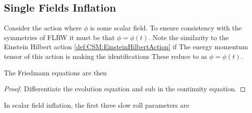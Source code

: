 \documentclass{article}
\begin{document}
\subsection{Single Fields Inflation}

Consider the action
where $\phi$ is some scalar field. To ensure consistency with the symmetries of FLRW it must be that $\phi = \phi(t)$.  Note the similarity to the Einstein Hilbert action \ref{def:CSM:EinsteinHilbertAction} if 
The energy momentum tensor of this action is 
making the identifications 
These reduce to 
as $\phi=\phi(t)$. 

The Friedmann equations are then 

\begin{prop}
\end{prop}
\begin{proof}
Differentiate the evolution equation and sub in the continuity equation. 
\end{proof}

\begin{definition}
In scalar field inflation, the first three slow roll parameters are 
\end{definition}
\end{document}
